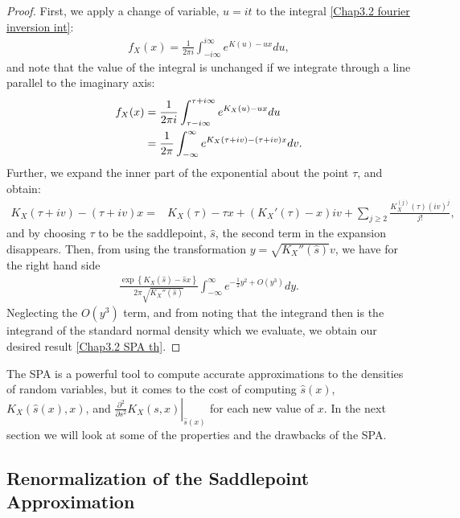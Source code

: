 \begin{theorem}
\begin{proof}
		First, we apply a change of variable, $u=it$ to the integral \ref{Chap3.2 fourier inversion int}:
		\begin{align}
		f_X(x)= \frac{1}{2\pi i} \int_{-i\infty}^{i\infty}e^{K(u)-ux}du,
		\end{align}
		and note that the value of the integral is unchanged if we integrate through a line parallel to the imaginary axis:
		\begin{align}
		f_X(x)&= \frac{1}{2\pi i} \int_{\tau-i\infty}^{\tau+i\infty}e^{K_X(u)-ux}du\notag\\
		&=\frac{1}{2\pi}\int_{-\infty}^{\infty}e^{K_X(\tau+iv)-(\tau+iv)x}dv.
		\end{align}
		Further, we expand the inner part of the exponential about the point $\tau$, and obtain:
		\begin{align}
		K_X(\tau+iv)-(\tau+iv)x = &K_X(\tau)-\tau x + \left( K_X'(\tau)-x \right)iv
		+\sum_{j\geq 2} \frac{K_X^{(j)}(\tau)(iv)^j}{j!},
		\end{align}
		and by choosing $\tau$ to be the saddlepoint, $\hat{s}$, the second term in the expansion disappears.
		Then, from using the transformation $y=\sqrt{K_X''(\hat{s})}v$, we have for the right hand side
		\begin{align}
		\frac{\exp\left\{ K_X(\hat{s})-\hat{s} x \right\}}{2\pi\sqrt{K_X''(\hat{s})}}\int_{-\infty}^{\infty}
		e^{-\frac{1}{2}y^2+O(y^3)}dy.
		\end{align}
		Neglecting the $O(y^3)$ term, and from noting that the integrand then is the integrand of the standard normal density which we evaluate, we obtain our desired result \eqref{Chap3.2 SPA th}.
	\end{proof}
\end{theorem}

The SPA is a powerful tool to compute accurate approximations to the densities of random variables, but it comes to the cost of computing $\hat{s}(x)$, $K_X(\hat{s}(x),x)$, and $\left.\frac{\partial^2}{\partial s^2}K_X(s,x)\right|_{\hat{s}(x)}$ for each new value of $x$.
In the next section we will look at some of the properties and the drawbacks of the SPA.







\subsection{Renormalization of the Saddlepoint Approximation}
\label{Chap3.3}

